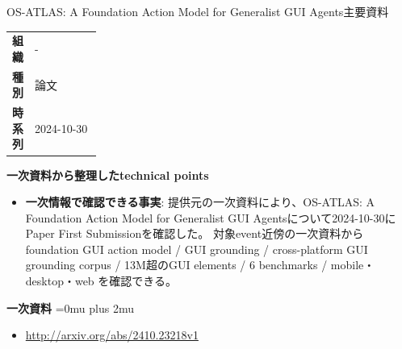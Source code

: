 \begin{technicalnote}{OS-ATLAS: A Foundation Action Model for Generalist GUI Agents}{主要資料}
\begingroup
\begin{tabularx}{\linewidth}{@{}>{\bfseries}p{0.22\linewidth}X@{}}
組織 & - \\
種別 & 論文 \\
時系列 & 2024-10-30 \\
\end{tabularx}
\smallskip
{\bfseries 一次資料から整理したtechnical points}
\begin{itemize}[leftmargin=1.5em,itemsep=0.35em]
\item \textbf{一次情報で確認できる事実}: 提供元の一次資料により、OS-ATLAS: A Foundation Action Model for Generalist GUI Agentsについて2024-10-30にPaper First Submissionを確認した。 対象event近傍の一次資料から foundation GUI action model / GUI grounding / cross-platform GUI grounding corpus / 13M超のGUI elements / 6 benchmarks / mobile・desktop・web を確認できる。
\end{itemize}
\begin{minipage}{\linewidth}
\begin{samepage}
{\bfseries 一次資料}
\begingroup\sloppy
\Urlmuskip=0mu plus 2mu\relax
\begin{itemize}[leftmargin=1.5em,itemsep=0.25em]
\item {\scriptsize\url{http://arxiv.org/abs/2410.23218v1}}
\end{itemize}
\endgroup
\end{samepage}
\end{minipage}
\endgroup
\end{technicalnote}
\medskip

